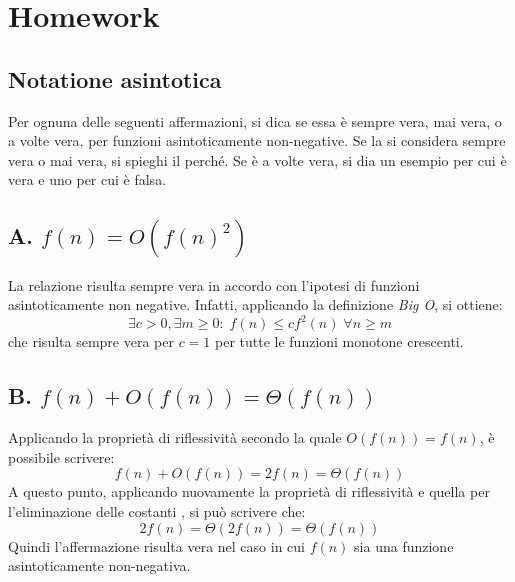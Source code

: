 \documentclass{article}
\begin{document}
\section{Homework}
\subsection{Notatione asintotica}

Per ognuna delle seguenti affermazioni, si dica se essa è sempre vera, mai vera, o a volte
vera, per funzioni asintoticamente non-negative. Se la si considera sempre vera o mai vera,
si spieghi il perché. Se è a volte vera, si dia un esempio per cui è vera e uno per cui è falsa.

\subsection*{A. $f(n) = O(f(n)^2)$}
La relazione risulta sempre vera in accordo con l'ipotesi di funzioni asintoticamente non negative. Infatti, applicando la definizione \textit{Big O}, si ottiene:
\begin{equation*}
    \exists c > 0, \exists m \geq 0: \; f(n)\leq c f^2(n)\; \forall n\geq m
\end{equation*}
che risulta sempre vera per $c=1$ per tutte le funzioni monotone crescenti.

\subsection*{B. $f(n) + O(f(n)) = \Theta(f(n))$}
Applicando la proprietà di riflessività secondo la quale $O(f(n)) = f(n)$, è possibile scrivere:
\begin{equation*}
    f(n) + O(f(n)) = 2f(n) = \Theta(f(n))
\end{equation*}
A questo punto, applicando nuovamente la proprietà di riflessività e quella per l'eliminazione delle costanti , si può scrivere che:
\begin{equation*}
   2f(n) = \Theta(2f(n)) = \Theta(f(n))
\end{equation*}
Quindi l'affermazione risulta vera nel caso in cui $f(n)$ sia una funzione asintoticamente non-negativa.
\end{document}
